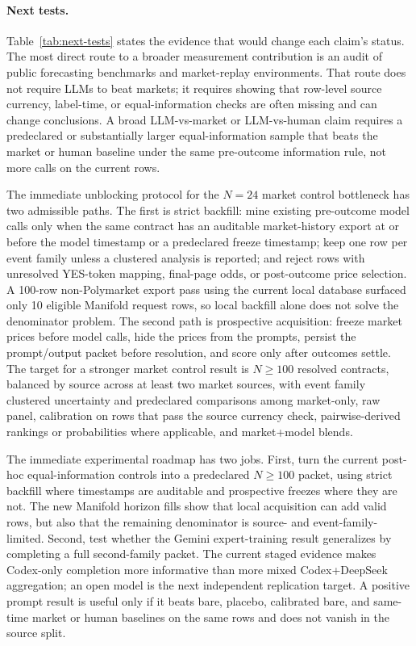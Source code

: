 \documentclass[11pt]{article}
\begin{document}
\paragraph{Next tests.} Table~\ref{tab:next-tests} states the evidence that would change each claim's status. The most direct route to a broader measurement contribution is an audit of public forecasting benchmarks and market-replay environments. That route does not require LLMs to beat markets; it requires showing that row-level source currency, label-time, or equal-information checks are often missing and can change conclusions. A broad LLM-vs-market or LLM-vs-human claim requires a predeclared or substantially larger equal-information sample that beats the market or human baseline under the same pre-outcome information rule, not more calls on the current rows.

The immediate unblocking protocol for the \(N=24\) market control bottleneck has two admissible paths. The first is strict backfill: mine existing pre-outcome model calls only when the same contract has an auditable market-history export at or before the model timestamp or a predeclared freeze timestamp; keep one row per event family unless a clustered analysis is reported; and reject rows with unresolved YES-token mapping, final-page odds, or post-outcome price selection. A 100-row non-Polymarket export pass using the current local database surfaced only 10 eligible Manifold request rows, so local backfill alone does not solve the denominator problem. The second path is prospective acquisition: freeze market prices before model calls, hide the prices from the prompts, persist the prompt/output packet before resolution, and score only after outcomes settle. The target for a stronger market control result is \(N \ge 100\) resolved contracts, balanced by source across at least two market sources, with event family clustered uncertainty and predeclared comparisons among market-only, raw panel, calibration on rows that pass the source currency check, pairwise-derived rankings or probabilities where applicable, and market+model blends.

The immediate experimental roadmap has two jobs. First, turn the current post-hoc equal-information controls into a predeclared \(N \ge 100\) packet, using strict backfill where timestamps are auditable and prospective freezes where they are not. The new Manifold horizon fills show that local acquisition can add valid rows, but also that the remaining denominator is source- and event-family-limited. Second, test whether the Gemini expert-training result generalizes by completing a full second-family packet. The current staged evidence makes Codex-only completion more informative than more mixed Codex+DeepSeek aggregation; an open model is the next independent replication target. A positive prompt result is useful only if it beats bare, placebo, calibrated bare, and same-time market or human baselines on the same rows and does not vanish in the source split.
\end{document}

